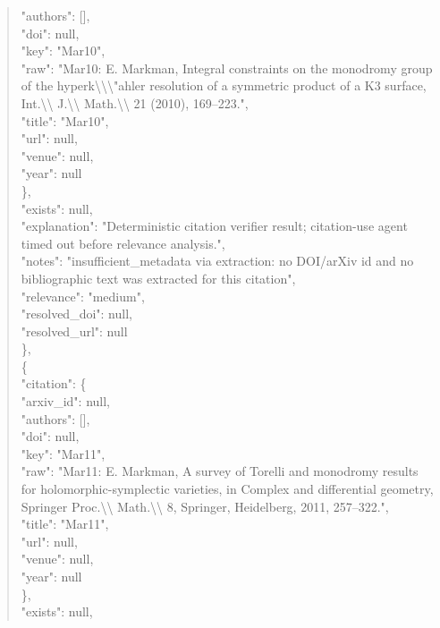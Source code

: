 \documentclass[11pt]{article}
\begin{document}
\begin{quote}
        "authors": [],\\
        "doi": null,\\
        "key": "Mar10",\\
        "raw": "Mar10: E. Markman, Integral constraints on the monodromy group of the hyperk\textbackslash{}\textbackslash{}\textbackslash{}"ahler resolution of a symmetric product of a K3 surface, Int.\textbackslash{}\textbackslash{} J.\textbackslash{}\textbackslash{} Math.\textbackslash{}\textbackslash{} 21 (2010), 169--223.",\\
        "title": "Mar10",\\
        "url": null,\\
        "venue": null,\\
        "year": null\\
      \},\\
      "exists": null,\\
      "explanation": "Deterministic citation verifier result; citation-use agent timed out before relevance analysis.",\\
      "notes": "insufficient\_metadata via extraction: no DOI/arXiv id and no bibliographic text was extracted for this citation",\\
      "relevance": "medium",\\
      "resolved\_doi": null,\\
      "resolved\_url": null\\
    \},\\
    \{\\
      "citation": \{\\
        "arxiv\_id": null,\\
        "authors": [],\\
        "doi": null,\\
        "key": "Mar11",\\
        "raw": "Mar11: E. Markman, A survey of Torelli and monodromy results for holomorphic-symplectic varieties, in Complex and differential geometry, Springer Proc.\textbackslash{}\textbackslash{} Math.\textbackslash{}\textbackslash{} 8, Springer, Heidelberg, 2011, 257--322.",\\
        "title": "Mar11",\\
        "url": null,\\
        "venue": null,\\
        "year": null\\
      \},\\
      "exists": null,\\

\end{quote}
\end{document}
